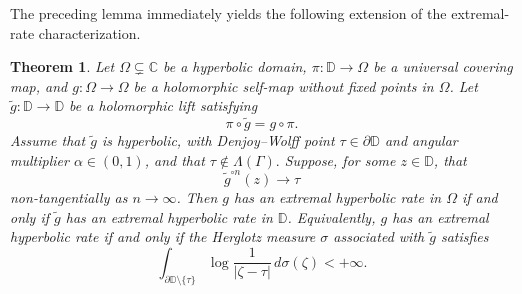 \documentclass[10pt,a4paper]{amsart}
\numberwithin{equation}{section}
\newtheorem{theorem}[equation]{Theorem}
\begin{document}
The preceding lemma immediately yields the following extension of the
extremal-rate characterization.

\begin{theorem}
\label{thm:multiply_connected}
Let $\Omega\subsetneq\mathbb C$ be a hyperbolic domain,
$\pi:\mathbb D\to\Omega$ be a universal covering map, and
$g:\Omega\to\Omega$ be a holomorphic self-map without fixed points in
$\Omega$. Let
$\widetilde g:\mathbb D\to\mathbb D$
be a holomorphic lift satisfying
\begin{equation}
\label{eq:lift_relation}
\pi\circ\widetilde g=g\circ\pi.
\end{equation}
Assume that $\widetilde g$ is hyperbolic, with Denjoy--Wolff point
$\tau\in\partial\mathbb D$ and angular multiplier
$\alpha\in(0,1)$, and that
$\tau\notin\Lambda(\Gamma).$
Suppose, for some $z\in\mathbb D$, that
\begin{equation*}
\widetilde g^{\circ n}(z)\longrightarrow\tau
\end{equation*}
non-tangentially as $n\to\infty$. Then $g$ has an extremal hyperbolic
rate in $\Omega$ if and only if $\widetilde g$ has an extremal
hyperbolic rate in $\mathbb D$. Equivalently, $g$ has an extremal
hyperbolic rate if and only if the Herglotz measure $\sigma$ associated
with $\widetilde g$ satisfies
\begin{equation}
\label{eq:multiply_extremal_condition}
\int_{\partial\mathbb D\setminus\{\tau\}}
\log\frac{1}{|\zeta-\tau|}
\,d\sigma(\zeta)
<+\infty.
\end{equation}
\end{theorem}
\end{document}

